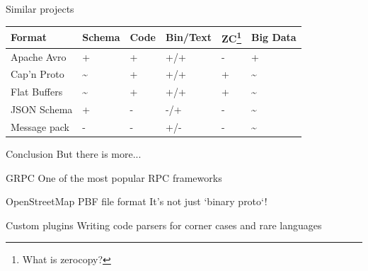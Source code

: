 \documentclass{beamer}
\begin{document}
\begin{frame}{Similar projects}
  \begin{center}
    \begin{tabular}{ l l l l l l }
      Format & Schema & Code & Bin/Text & ZC\footnote[1]{ What is zerocopy? }  & Big Data \\
      \hline
      Apache Avro & + & + & +/+ & - & + \\
      Cap'n Proto & \textasciitilde & + & +/+ & + & \textasciitilde \\
      Flat Buffers & \textasciitilde & + & +/+ & + & \textasciitilde \\
      JSON Schema & + & - & -/+ & - & \textasciitilde \\
      Message pack & - & - & +/- & - & \textasciitilde
    \end{tabular}
  \end{center}
\end{frame}

\begin{frame}{Conclusion}
But there is more...
\end{frame}

\begin{frame}{GRPC}
One of the most popular RPC frameworks
\end{frame}

\begin{frame}{OpenStreetMap PBF file format}
It's not just `binary proto`!
\end{frame}

\begin{frame}{Custom plugins}
Writing code parsers for corner cases and rare languages
\end{frame}
\end{document}
